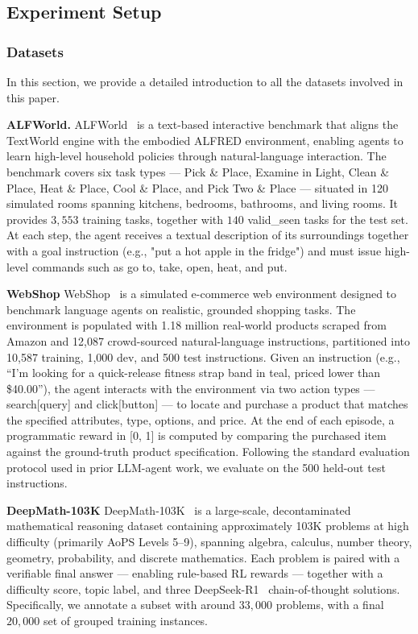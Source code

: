 \subsection{Experiment Setup}

\subsubsection{Datasets}

In this section, we provide a detailed introduction to all the datasets involved in this paper.

\noindent\textbf{ALFWorld.} ALFWorld~\citep{shridhar2021alfworld} is a text-based interactive benchmark that aligns the TextWorld engine with the embodied ALFRED environment, enabling agents to learn high-level household policies through natural-language interaction. The benchmark covers six task types — Pick \& Place, Examine in Light, Clean \& Place, Heat \& Place, Cool \& Place, and Pick Two \& Place — situated in 120 simulated rooms spanning kitchens, bedrooms, bathrooms, and living rooms. It provides $3,553$ training tasks, together with $140$ valid\_seen tasks for the test set. At each step, the agent receives a textual description of its surroundings together with a goal instruction (e.g., "put a hot apple in the fridge") and must issue high-level commands such as go to, take, open, heat, and put.

\noindent\textbf{WebShop} WebShop~\citep{10.5555/3600270.3601778} is a simulated e-commerce web environment designed to benchmark language agents on realistic, grounded shopping tasks. The environment is populated with 1.18 million real-world products scraped from Amazon and 12,087 crowd-sourced natural-language instructions, partitioned into 10,587 training, 1,000 dev, and 500 test instructions. Given an instruction (e.g., ``I'm looking for a quick-release fitness strap band in teal, priced lower than \$40.00''), the agent interacts with the environment via two action types — search[query] and click[button] — to locate and purchase a product that matches the specified attributes, type, options, and price. At the end of each episode, a programmatic reward in [0, 1] is computed by comparing the purchased item against the ground-truth product specification. Following the standard evaluation protocol used in prior LLM-agent work, we evaluate on the 500 held-out test instructions.

\noindent\textbf{DeepMath-103K} DeepMath-103K~\citep{he2026deepmathk} is a large-scale, decontaminated mathematical reasoning dataset containing approximately 103K problems at high difficulty (primarily AoPS Levels 5–9), spanning algebra, calculus, number theory, geometry, probability, and discrete mathematics. Each problem is paired with a verifiable final answer — enabling rule-based RL rewards — together with a difficulty score, topic label, and three DeepSeek-R1~\citep{guo2025deepseek} chain-of-thought solutions. Specifically, we annotate a subset with around $33,000$ problems, with a final $20,000$ set of grouped training instances.


